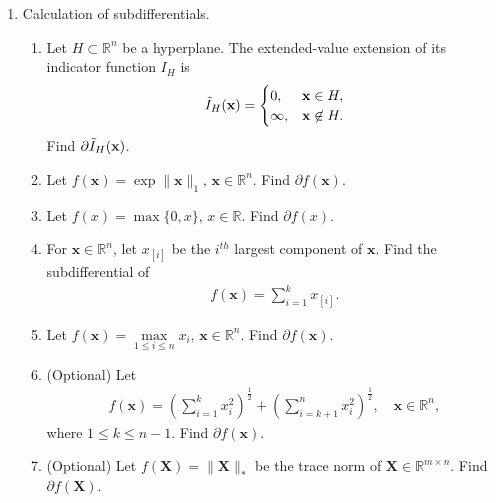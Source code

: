 \documentclass[11pt,letter,notitlepage]{article}
\begin{document}
\newpage
\begin{exercise}[Subdifferentials]
    \begin{enumerate}
        \item Calculation of subdifferentials.
        \begin{enumerate}
            \item Let $H\subset\mathbb{R}^n$ be a hyperplane. The extended-value extension of its indicator function $I_H$ is
            \begin{align*}
                \Tilde{I}_H(\textbf{x})=\begin{cases}
                    0,&\textbf{x}\in H,\\
                    \infty,&\textbf{x}\not\in H.
                \end{cases}
            \end{align*}
            Find $\partial \Tilde{I}_H(\textbf{x})$.
            
            \item Let $f(\textbf{x})=\exp{\|\textbf{x}\|_1},\, \textbf{x}\in\mathbb{R}^n$. Find $\partial f(\textbf{x})$.
            
            \item Let $f(x)=\max\{0,x\},\,x\in\mathbb{R}$. Find $\partial f(x)$.
            
            \item For $\textbf{x}\in\mathbb{R}^n$, let $x_{[i]}$ be the $i^{th}$ largest component of $\textbf{x}$. Find the subdifferential of
            \begin{align*}
                f(\textbf{x})=\sum_{i=1}^k x_{[i]}.
            \end{align*}
            
            \item Let $f(\textbf{x})=\max\limits_{1\le i\le n} x_i,\, \textbf{x}\in\mathbb{R}^n$. Find $\partial f(\textbf{x})$.
            
            \item (Optional) Let
            \begin{align*}
                f(\textbf{x})=\left(\sum\limits_{i=1}^k x_i^2\right)^{\frac{1}{2}}+\left(\sum\limits_{i=k+1}^n x_i^2\right)^{\frac{1}{2}},\quad \textbf{x}\in\mathbb{R}^n,
            \end{align*}
            where $1\le k\le n-1$. Find $\partial f(\textbf{x})$.
            
            \item (Optional) Let $f(\textbf{X})=\|\textbf{X}\|_*$ be the trace norm of $\textbf{X}\in\mathbb{R}^{m\times n}$. Find $\partial f(\textbf{X})$.
            

\end{enumerate}
\end{enumerate}
\end{exercise}
\end{document}
